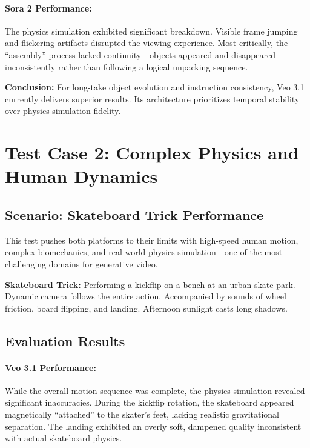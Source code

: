 \paragraph{Sora 2 Performance:}
The physics simulation exhibited significant breakdown. Visible frame jumping and flickering artifacts disrupted the viewing experience. Most critically, the ``assembly'' process lacked continuity---objects appeared and disappeared inconsistently rather than following a logical unpacking sequence.

\begin{resultbox}
\textbf{Conclusion:} For long-take object evolution and instruction consistency, Veo 3.1 currently delivers superior results. Its architecture prioritizes temporal stability over physics simulation fidelity.
\end{resultbox}

\section{Test Case 2: Complex Physics and Human Dynamics}
\label{sec:test-case-2}

\subsection{Scenario: Skateboard Trick Performance}

This test pushes both platforms to their limits with high-speed human motion, complex biomechanics, and real-world physics simulation---one of the most challenging domains for generative video.

\begin{promptbox}
\small
\textbf{Skateboard Trick:} Performing a kickflip on a bench at an urban skate park. Dynamic camera follows the entire action. Accompanied by sounds of wheel friction, board flipping, and landing. Afternoon sunlight casts long shadows.
\end{promptbox}

\subsection{Evaluation Results}

\paragraph{Veo 3.1 Performance:}
While the overall motion sequence was complete, the physics simulation revealed significant inaccuracies. During the kickflip rotation, the skateboard appeared magnetically ``attached'' to the skater's feet, lacking realistic gravitational separation. The landing exhibited an overly soft, dampened quality inconsistent with actual skateboard physics.

